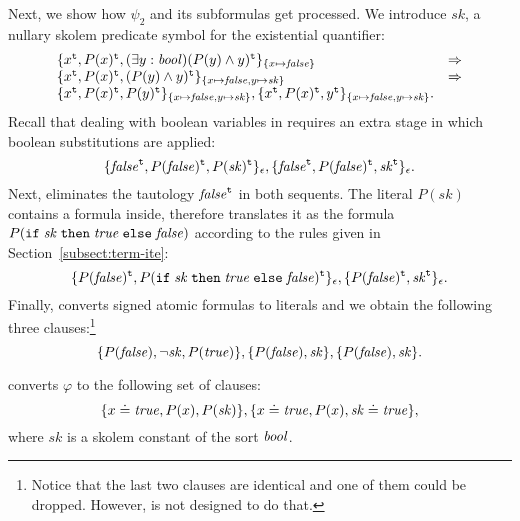 \begin{example*}
Next, we show how $\psi_2$ and its subformulas get processed. 
We introduce $\mathit{sk}$, a nullary skolem predicate symbol for the existential quantifier:
\[
\begin{array}{ll}
\{x^{\mathtt{t}}, P(x)^{\mathtt{t}}, (\exists y:\mathit{bool})(P(y) \land y)^{\mathtt{t}}\}_{\{x \mapsto \mathit{false}\}} & \Rightarrow\\
\{x^{\mathtt{t}}, P(x)^{\mathtt{t}}, (P(y) \land y)^{\mathtt{t}}\}_{\{x \mapsto \mathit{false}, y \mapsto \mathit{sk}\}} & \Rightarrow\\
\{x^{\mathtt{t}}, P(x)^{\mathtt{t}}, P(y)^{\mathtt{t}}\}_{\{x \mapsto \mathit{false}, y \mapsto \mathit{sk}\}}, 
\{x^{\mathtt{t}}, P(x)^{\mathtt{t}}, y^{\mathtt{t}}\}_{\{x \mapsto \mathit{false}, y \mapsto \mathit{sk}\}}.
\end{array}
\]
Recall that dealing with boolean variables in \nfcnf{} requires an extra stage in which boolean substitutions are applied:
\[
\{\mathit{false}^{\mathtt{t}}, P(\mathit{false})^{\mathtt{t}}, P(\mathit{sk})^{\mathtt{t}}\}_\epsilon, 
\{\mathit{false}^{\mathtt{t}}, P(\mathit{false})^{\mathtt{t}}, \mathit{sk}^{\mathtt{t}}\}_\epsilon.
\]
Next, \nfcnf{} eliminates the tautology ${\mathit{false}}^{\mathtt{t}}$ in both sequents. The literal $P(\mathit{sk})$ contains a formula inside, therefore \nfcnf{} translates it as the formula $P(\mathtt{if}\;{\mathit{sk}}\;\allowbreak\mathtt{then}\;{\mathit{true}}\;\allowbreak\mathtt{else}\;{\mathit{false}})$ according to the rules given in Section~\ref{subsect:term-ite}:
\[
\{P(\mathit{false})^{\mathtt{t}}, P(\mathtt{if}\;{\mathit{sk}}\;\allowbreak\mathtt{then}\;{\mathit{true}}\;\allowbreak\mathtt{else}\;{\mathit{false}})^{\mathtt{t}}\}_\epsilon, 
\{P(\mathit{false})^{\mathtt{t}}, \mathit{sk}^{\mathtt{t}}\}_\epsilon.
\]
Finally, \nfcnf{} converts signed atomic formulas to literals and we obtain the following three clauses:\footnote{Notice that the last two clauses are identical and one of them could be dropped. 
However, \nfcnf{} is not designed to do that.}
\[
\{P(\mathit{false}), \neg \mathit{sk}, P(\mathit{true})\}, \{P(\mathit{false}), \mathit{sk}\}, \{P(\mathit{false}), \mathit{sk}\}.
\]

\oldcnf{} converts $\varphi$ to the following set of clauses:
$$\{ x \doteq \mathit{true}, P(x), P(\mathit{sk}) \}, \{ x \doteq \mathit{true}, P(x), \mathit{sk}\doteq \mathit{true} \},$$
where $\mathit{sk}$ is a skolem constant of the sort $\mathit{bool}$.
\QED\end{example*}

